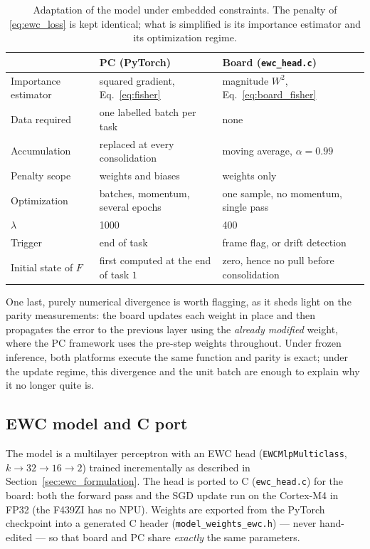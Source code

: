 \begin{table}[htbp]
\centering
\caption{Adaptation of the model under embedded constraints. The penalty of \eqref{eq:ewc_loss} is
kept identical; what is simplified is its importance estimator and its optimization regime.}
\label{tab:ewc_port}
\footnotesize
\begin{tabular}{@{}p{30mm}p{35mm}p{50mm}@{}}
\toprule
 & \textbf{PC (PyTorch)} & \textbf{Board (\texttt{ewc\_head.c})} \\
\midrule
Importance estimator & squared gradient, Eq.~\eqref{eq:fisher} & magnitude $W^2$, Eq.~\eqref{eq:board_fisher} \\
Data required        & one labelled batch per task & none \\
Accumulation         & replaced at every consolidation & moving average, $\alpha = \num{0.99}$ \\
Penalty scope        & weights and biases & weights only \\
Optimization         & batches, momentum, several epochs & one sample, no momentum, single pass \\
$\lambda$            & \num{1000} & \num{400} \\
Trigger              & end of task & frame flag, or drift detection \\
Initial state of $F$ & first computed at the end of task $1$ & zero, hence no pull before consolidation \\
\bottomrule
\end{tabular}
\end{table}

One last, purely numerical divergence is worth flagging, as it sheds light on the parity
measurements: the board updates each weight in place and then propagates the error to the previous
layer using the \emph{already modified} weight, where the PC framework uses the pre-step weights
throughout. Under frozen inference, both platforms execute the same function and parity is exact;
under the update regime, this divergence and the unit batch are enough to explain why it no longer
quite is.

\subsection{EWC model and C port}

The model is a multilayer perceptron with an EWC head (\texttt{EWCMlpMulticlass}, $k \to 32 \to 16 \to 2$)
trained incrementally as described in Section~\ref{sec:ewc_formulation}. The head is ported to C (\texttt{ewc\_head.c}) for the
board: both the forward pass and the \gls{SGD} update run on the Cortex-M4 in FP32 (the F439ZI has no NPU).
Weights are exported from the PyTorch checkpoint into a generated C header
(\texttt{model\_weights\_ewc.h}) --- never hand-edited --- so that board and PC share \emph{exactly} the
same parameters.

